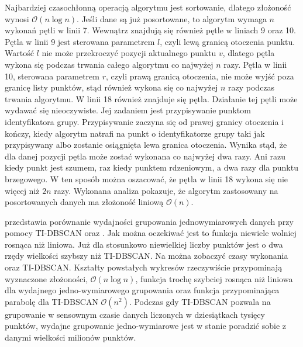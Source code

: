 Najbardziej czasochłonną operacją algorytmu jest sortowanie, dlatego złożoność wynosi $ \mathcal{O}(n\log{}n) $. Jeśli dane są już posortowane, to algorytm wymaga $ n $ wykonań pętli w linii 7. Wewnątrz znajdują się również pętle w liniach 9 oraz 10. Pętla w linii 9 jest sterowana parametrem $ l $, czyli lewą granicą otoczenia punktu. Wartość $ l $ nie może przekroczyć pozycji aktualnego punktu $ v $, dlatego pętla wykona się podczas trwania całego algorytmu co najwyżej $ n $ razy. Pętla w linii 10, sterowana parametrem $ r $, czyli prawą granicą otoczenia, nie może wyjść poza granicę listy punktów, stąd również wykona się co najwyżej $ n $ razy podczas trwania algorytmu. W linii 18 również znajduje się pętla. Działanie tej pętli może wydawać się nieoczywiste. Jej zadaniem jest przypisywanie punktom identyfikatora grupy. Przypisywanie zaczyna się od prawej granicy otoczenia i kończy, kiedy algorytm natrafi na punkt o identyfikatorze grupy taki jak przypisywany albo zostanie osiągnięta lewa granica otoczenia. Wynika stąd, że dla danej pozycji pętla może zostać wykonana co najwyżej dwa razy. Ani razu kiedy punkt jest szumem, raz kiedy punktem rdzeniowym, a dwa razy dla punktu brzegowego. W ten sposób można oszacować, że pętla w linii 18 wykona się nie więcej niż $ 2n $ razy. Wykonana analiza pokazuje, że algorytm zastosowany na posortowanych danych ma złożoność liniową $ \mathcal{O}(n). $\par



 przedstawia porównanie wydajności grupowania jednowymiarowych danych przy pomocy TI-DBSCAN oraz . Jak można oczekiwać jest to funkcja niewiele wolniej rosnąca niż liniowa. Już dla stosunkowo niewielkiej liczby punktów  jest o dwa rzędy wielkości szybszy niż TI-DBSCAN. Na  można zobaczyć czasy wykonania  oraz TI-DBSCAN. Kształty powstałych wykresów rzeczywiście przypominają wyznaczone złożoności, $ \mathcal{O}(n\log{}n) $, funkcja trochę szybciej rosnąca niż liniowa dla wydajnego jedno-wymiarowego grupowania oraz funkcja przypominająca parabolę dla TI-DBSCAN $ \mathcal{O}(n^2) $. Podczas gdy TI-DBSCAN pozwala na grupowanie w sensownym czasie danych liczonych w dziesiątkach tysięcy punktów, wydajne grupowanie jedno-wymiarowe jest w stanie poradzić sobie z danymi wielkości milionów punktów.\par

